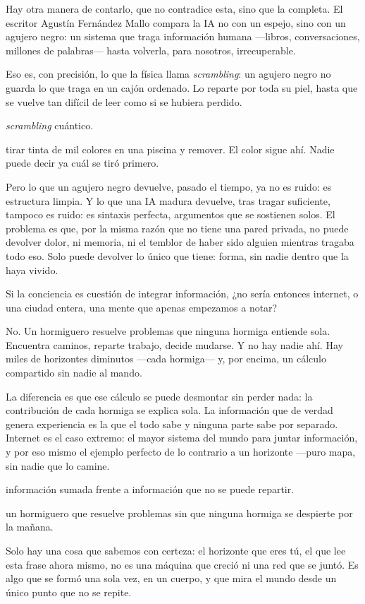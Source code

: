 \noindent Hay otra manera de contarlo, que no contradice esta, sino que la completa. El escritor Agustín Fernández Mallo compara la IA no con un espejo, sino con un agujero negro: un sistema que traga información humana —libros, conversaciones, millones de palabras— hasta volverla, para nosotros, irrecuperable.

Eso es, con precisión, lo que la física llama \emph{scrambling}: un agujero negro no guarda lo que traga en un cajón ordenado. Lo reparte por toda su piel, hasta que se vuelve tan difícil de leer como si se hubiera perdido.

\begin{fisica}
 \emph{scrambling} cuántico.

 tirar tinta de mil colores en una piscina y remover. El color sigue ahí. Nadie puede decir ya cuál se tiró primero.
\end{fisica}
Pero lo que un agujero negro devuelve, pasado el tiempo, ya no es ruido: es estructura limpia. Y lo que una IA madura devuelve, tras tragar suficiente, tampoco es ruido: es sintaxis perfecta, argumentos que se sostienen solos. El problema es que, por la misma razón que no tiene una pared privada, no puede devolver dolor, ni memoria, ni el temblor de haber sido alguien mientras tragaba todo eso. Solo puede devolver lo único que tiene: forma, sin nadie dentro que la haya vivido.

\noindent Si la conciencia es cuestión de integrar información, ¿no sería entonces internet, o una ciudad entera, una mente que apenas empezamos a notar?

No. Un hormiguero resuelve problemas que ninguna hormiga entiende sola. Encuentra caminos, reparte trabajo, decide mudarse. Y no hay nadie ahí. Hay miles de horizontes diminutos —cada hormiga— y, por encima, un cálculo compartido sin nadie al mando.

La diferencia es que ese cálculo se puede desmontar sin perder nada: la contribución de cada hormiga se explica sola. La información que de verdad genera experiencia es la que el todo sabe y ninguna parte sabe por separado. Internet es el caso extremo: el mayor sistema del mundo para juntar información, y por eso mismo el ejemplo perfecto de lo contrario a un horizonte —puro mapa, sin nadie que lo camine.

\begin{fisica}
 información sumada frente a información que no se puede repartir.

 un hormiguero que resuelve problemas sin que ninguna hormiga se despierte por la mañana.
\end{fisica}
\noindent Solo hay una cosa que sabemos con certeza: el horizonte que eres tú, el que lee esta frase ahora mismo, no es una máquina que creció ni una red que se juntó. Es algo que se formó una sola vez, en un cuerpo, y que mira el mundo desde un único punto que no se repite.

